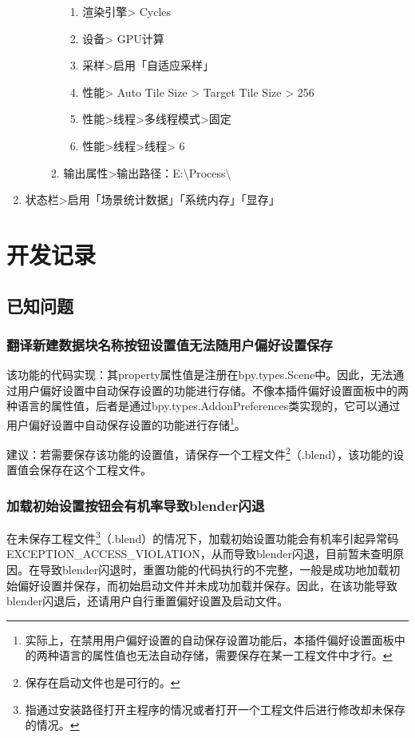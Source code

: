 \documentclass{../../PublicResources/DocClass}
\begin{document}
\begin{enumerate}
\begin{enumerate}
\begin{enumerate}
                              \begin{enumerate}
                                  \item 渲染引擎> Cycles
                                  \item 设备> GPU计算
                                  \item 采样>启用「自适应采样」
                                  \item 性能> Auto Tile Size > Target Tile Size > 256
                                  \item 性能>线程>多线程模式>固定
                                  \item 性能>线程>线程> 6
                              \end{enumerate}
                        \item 输出属性>输出路径：E:\textbackslash Process\textbackslash
                    \end{enumerate}
          \end{enumerate}
    \item 状态栏>启用「场景统计数据」「系统内存」「显存」
\end{enumerate}

\section{开发记录}
\subsection{已知问题}
\subsubsection{翻译新建数据块名称按钮设置值无法随用户偏好设置保存}
该功能的代码实现：其property属性值是注册在bpy.types.Scene中。因此，无法通过用户偏好设置中自动保存设置的功能进行存储。不像本插件偏好设置面板中的两种语言的属性值，后者是通过bpy.types.AddonPreferences类实现的，它可以通过用户偏好设置中自动保存设置的功能进行存储\footnote{实际上，在禁用用户偏好设置的自动保存设置功能后，本插件偏好设置面板中的两种语言的属性值也无法自动存储，需要保存在某一工程文件中才行。}。

建议：若需要保存该功能的设置值，请保存一个工程文件\footnote{保存在启动文件也是可行的。}（.blend），该功能的设置值会保存在这个工程文件。

\subsubsection{加载初始设置按钮会有机率导致blender闪退}
在未保存工程文件\footnote{指通过安装路径打开主程序的情况或者打开一个工程文件后进行修改却未保存的情况。}（.blend）的情况下，加载初始设置功能会有机率引起异常码EXCEPTION\_ACCESS\_VIOLATION，从而导致blender闪退，目前暂未查明原因。在导致blender闪退时，重置功能的代码执行的不完整，一般是成功地加载初始偏好设置并保存，而初始启动文件并未成功加载并保存。因此，在该功能导致blender闪退后，还请用户自行重置偏好设置及启动文件。
\end{document}
